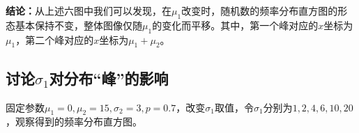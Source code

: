 \documentclass[CJK]{ctexart}
\begin{document}
\textbf{结论：}从上述六图中我们可以发现，在$\mu_1$改变时，随机数的频率分布直方图的形态基本保持不变，整体图像仅随$\mu_1$的变化而平移。其中，第一个峰对应的$x$坐标为$\mu_1$，第二个峰对应的$x$坐标为$\mu_1+\mu_2$。

\subsection{讨论$\sigma_1$对分布“峰”的影响}

固定参数$\mu_1=0,\mu_2=15,\sigma_2=3,p=0.7$，改变$\sigma_1$取值，令$\sigma_1$分别为$1,2,4,6,10,20$，观察得到的频率分布直方图。

\begin{figure}[H]
    \centering
    \quad
    \quad
    \quad
\end{figure}
\end{document}
